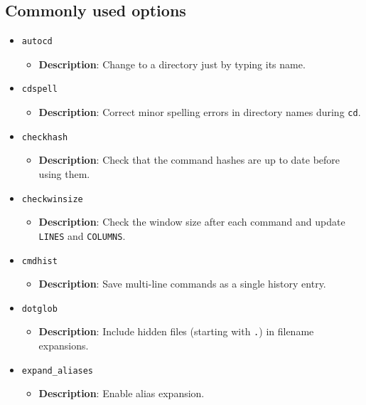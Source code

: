 \documentclass{report}
\begin{document}
\subsection{Commonly used options}
\begin{itemize}
    \item \texttt{autocd}
        \begin{itemize}
            \item \textbf{Description}: Change to a directory just by typing its name.
        \end{itemize}

    \item \texttt{cdspell}
        \begin{itemize}
            \item \textbf{Description}: Correct minor spelling errors in directory names during \texttt{cd}.
        \end{itemize}

    \item \texttt{checkhash}
        \begin{itemize}
            \item \textbf{Description}: Check that the command hashes are up to date before using them.
        \end{itemize}

    \item \texttt{checkwinsize}
        \begin{itemize}
            \item \textbf{Description}: Check the window size after each command and update \texttt{LINES} and \texttt{COLUMNS}.
        \end{itemize}

    \item \texttt{cmdhist}
        \begin{itemize}
            \item \textbf{Description}: Save multi-line commands as a single history entry.
        \end{itemize}

    \item \texttt{dotglob}
        \begin{itemize}
            \item \textbf{Description}: Include hidden files (starting with \texttt{.}) in filename expansions.
        \end{itemize}

    \item \texttt{expand\_aliases}
        \begin{itemize}
            \item \textbf{Description}: Enable alias expansion.
        \end{itemize}


\end{itemize}
\end{document}
